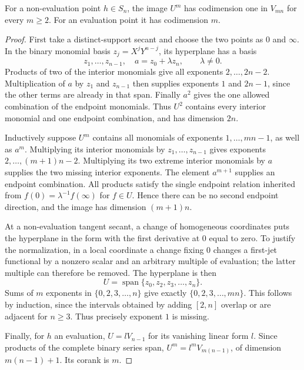 \begin{lemma}
\label{lem:hyperplane-secant-ranks}
For a non-evaluation point $h\in S_n$, the image $U^m$ has
codimension one in $V_{mn}$ for every $m\ge2$. For an evaluation
point it has codimension $m$.
\end{lemma}
\begin{proof}
First take a distinct-support secant and choose the two points as
$0$ and $\infty$. In the binary monomial basis
$z_j=X^jY^{n-j}$, its hyperplane has a basis
\[
 z_1,\ldots,z_{n-1},\quad a=z_0+\lambda z_n,
                       \qquad\lambda\ne0.
\]
Products of two of the interior monomials give all exponents
$2,\ldots,2n-2$. Multiplication of $a$ by $z_1$ and $z_{n-1}$
then supplies exponents $1$ and $2n-1$, since the other terms are
already in that span. Finally $a^2$ gives the one allowed combination
of the endpoint monomials. Thus $U^2$ contains every interior
monomial and one endpoint combination, and has dimension $2n$.

Inductively suppose $U^m$ contains all monomials of exponents
$1,\ldots,mn-1$, as well as $a^m$. Multiplying its interior
monomials by $z_1,\ldots,z_{n-1}$ gives exponents
$2,\ldots,(m+1)n-2$. Multiplying its two extreme interior monomials
by $a$ supplies the two missing interior exponents. The element
$a^{m+1}$ supplies an endpoint combination. All products satisfy the
single endpoint relation inherited from $f(0)=\lambda^{-1}f(\infty)$
for $f\in U$. Hence there can be no second endpoint direction, and
the image has dimension $(m+1)n$.

At a non-evaluation tangent secant, a change of homogeneous
coordinates puts the hyperplane in the form with the first derivative
at $0$ equal to zero. To justify the normalization, in a local
coordinate a change fixing $0$ changes a first-jet functional by a
nonzero scalar and an arbitrary multiple of evaluation; the latter
multiple can therefore be removed. The hyperplane is then
\[
 U=\operatorname{span}\{z_0,z_2,z_3,\ldots,z_n\}.
\]
Sums of $m$ exponents in $\{0,2,3,\ldots,n\}$ give exactly
$\{0,2,3,\ldots,mn\}$. This follows by induction, since the
intervals obtained by adding $[2,n]$ overlap or are adjacent for
$n\ge3$. Thus precisely exponent $1$ is missing.

Finally, for $h$ an evaluation, $U=lV_{n-1}$ for its vanishing
linear form $l$. Since products of the complete binary series span,
$U^m=l^mV_{m(n-1)}$, of dimension $m(n-1)+1$. Its corank is $m$.
\end{proof}

